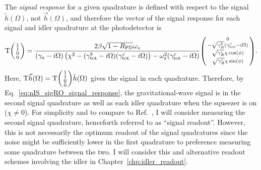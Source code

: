 The \emph{signal response} for a given quadrature is defined with respect to the signal $\tilde h(\Omega)$, not $\vec h(\Omega)$, and therefore the vector of the signal response for each signal and idler quadrature at the photodetector is
\begin{equation}\label{eq:nIS_sigRO_signal_response}
\text{T}\begin{psmallmatrix}1 \\1\\0\\0\end{psmallmatrix} = \frac{2 \beta \sqrt{1-R_\text{PD}} \omega_s}{(\gamma_a-i \Omega ) \left(\chi ^2-(\gamma^b_\text{tot}-i\Omega) (\gamma^c_\text{tot}-i\Omega)\right)-\omega_s^2 (\gamma^c_\text{tot}-i \Omega )} \begin{psmallmatrix}0 \\-\sqrt{\gamma^b_R}(\gamma^c_\text{tot}-i\Omega)\\\sqrt{\gamma^c_R}\chi\cos(\phi)\\\sqrt{\gamma^c_R}\chi\sin(\phi)\end{psmallmatrix}.
\end{equation}
Here, $\text{T}\vec h(\Omega)=\text{T}\begin{psmallmatrix}1 \\1\\0\\0\end{psmallmatrix}\tilde h(\Omega)$ gives the signal in each quadrature.
Therefore, by Eq.~\ref{eq:nIS_sigRO_signal_response}, the gravitational-wave signal is in the second signal quadrature as well as each idler quadrature when the squeezer is on ($\chi\neq0$). For simplicity and to compare to Ref.~\cite{liBroadbandSensitivityImprovement2020}, I will consider measuring the second signal quadrature, henceforth referred to as ``signal readout''. However, this is not necessarily the optimum readout of the signal quadratures since the noise might be sufficiently lower in the first quadrature to preference measuring some quadrature between the two. I will consider this and alternative readout schemes involving the idler in Chapter~\ref{chp:idler_readout}.

